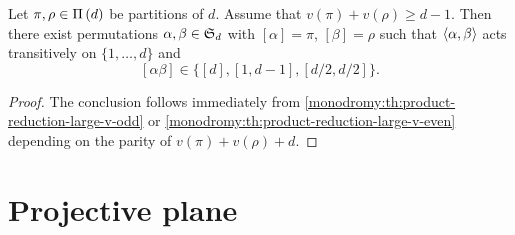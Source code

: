 \begin{corollary}\label{monodromy:th:product-reduction-large-v}
Let $\pi,\rho\in\Pi\left(d\right)$ be partitions of $d$. Assume that $v(\pi)+v(\rho)\ge d-1$. Then there exist permutations $\alpha,\beta\in\symgroup[d]$ with $[\alpha]=\pi$, $[\beta]=\rho$ such that $\left\langle\alpha,\beta\right\rangle$ acts transitively on $\{1,\ldots,d\}$ and
\[
[\alpha\beta]\in\{[d],[1,d-1],[d/2,d/2]\}.
\]
\end{corollary}
\begin{proof}
The conclusion follows immediately from \cref{monodromy:th:product-reduction-large-v-odd} or \cref{monodromy:th:product-reduction-large-v-even} depending on the parity of $v(\pi)+v(\rho)+d$.
\end{proof}

\section{Projective plane}

